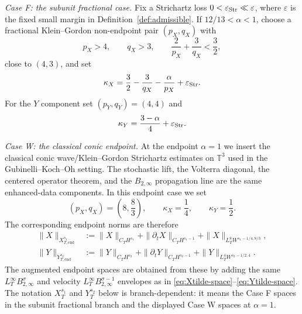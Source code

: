 \documentclass[10pt]{amsart}
\numberwithin{equation}{section}
\theoremstyle{plain}
\theoremstyle{definition}
\theoremstyle{remark}
\newcommand{\eps}{\varepsilon}
\begin{document}
\medskip
\noindent\emph{Case F: the subunit fractional case.}
Fix a Strichartz loss $0<\eps_{\rm Str}\ll\eps$, where $\eps$ is the fixed small margin in Definition~\ref{def:admissible}.  If $12/13<\alpha<1$, choose a fractional Klein--Gordon non-endpoint pair $(p_X,q_X)$ with
\begin{equation}\label{eq:pxqx-admissible}
 p_X>4,
 \qquad q_X>3,
 \qquad \frac2{p_X}+\frac3{q_X}<\frac32,
\end{equation}
close to $(4,3)$, and set
\begin{equation}\label{eq:kappaX-fractional}
 \kappa_X=\frac32-\frac3{q_X}-\frac{\alpha}{p_X}+\eps_{\rm Str}.
\end{equation}
For the $Y$ component set $(p_Y,q_Y)=(4,4)$ and
\begin{equation}\label{eq:kappaY-fractional}
 \kappa_Y=\frac{3-\alpha}{4}+\eps_{\rm Str}.
\end{equation}


\medskip
\noindent\emph{Case W: the classical conic endpoint.}
At the endpoint $\alpha=1$ we insert the classical conic wave/Klein--Gordon Strichartz estimates on $\mathbb T^3$ used in the Gubinelli--Koch--Oh setting.  The stochastic lift, the Volterra diagonal, the centered operator theorem, and the $B_{2,\infty}$ propagation line are the same enhanced-data components.  In this endpoint case we set
\begin{equation}\label{eq:case-W-exponents}
        (p_X,q_X)=\left(8,\frac83\right),
        \qquad \kappa_X=\frac14,
        \qquad \kappa_Y=\frac12.
\end{equation}
The corresponding endpoint norms are therefore
\begin{align}\label{eq:case-W-spaces-display}
\|X\|_{X^{s_1}_{T,\mathrm{end}}}
&:=\|X\|_{C_TH^{s_1}}+\|\partial_tX\|_{C_TH^{s_1-1}}
  +\|X\|_{L_T^8W^{s_1-1/4,8/3}},\\
\|Y\|_{Y^{s_2}_{T,\mathrm{end}}}
&:=\|Y\|_{C_TH^{s_2}}+\|\partial_tY\|_{C_TH^{s_2-1}}
  +\|Y\|_{L_T^4W^{s_2-1/2,4}}.
\end{align}
The augmented endpoint spaces are obtained from these by adding the same $L_T^\infty B_{2,\infty}^\sigma$ and velocity $L_T^\infty B_{2,\infty}^{\sigma-1}$ envelopes as in \eqref{eq:Xtilde-space}--\eqref{eq:Ytilde-space}.  The notation $X_T^{s_1}$ and $Y_T^{s_2}$ below is branch-dependent: it means the Case F spaces in the subunit fractional branch and the displayed Case W spaces at $\alpha=1$.
\end{document}

